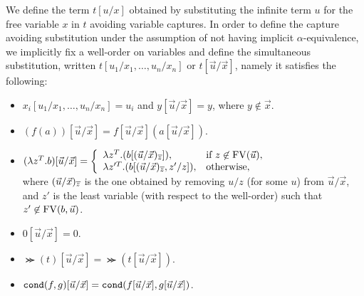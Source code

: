 We define the term $t[u/x]$ obtained by substituting the infinite term $u$ for the free variable $x$ in $t$ 
avoiding variable captures.
In order to define the capture avoiding substitution
under the assumption of not having implicit $\alpha$-equivalence, 
we implicitly fix a well-order on variables
and define the simultaneous substitution,
written $t[u_1/x_1,\ldots,u_n/x_n]$ or $t[\vec{u}/{\vec{x}}]$,
namely it satisfies the following:
\begin{itemize}
\item
  $x_i[u_1/x_1,\ldots,u_n/x_n] = u_i$ and $y[\vec{u}/\vec{x}] = y$, where $y\not\in\vec{x}$. 
\item
  $(f(a))[\vec{u}/\vec{x}] = f[\vec{u}/\vec{x}](a[\vec{u}/\vec{x}])$.
\item
  $(\lambda z^T.b)[\vec{u}/\vec{x}] =
  \left\{
  \begin{array}{ll}
    \lambda z^T.(b[(\vec{u}/\vec{x})_{\overline{z}}]),
    &
    \text{if $z \not\in {{\rm FV}}(\vec{u})$},
    \\
    \lambda z'^T.(b[(\vec{u}/\vec{x})_{\overline{z}},z'/z]),
    &
    \text{otherwise},
  \end{array}
  \right.$
  \\
  where
  $(\vec{u}/\vec{x})_{\overline{z}}$ is the one obtained by removing $u/z$ (for some $u$) from $\vec{u}/\vec{x}$,
  and 
  $z'$ is the least variable (with respect to the well-order)
  such that $z' \not\in {{\rm FV}}(b,\vec{u})$.
\item
  $0[\vec{u}/\vec{x}] = 0$.
\item
  $\Succ(t)[\vec{u}/\vec{x}] = \Succ(t[\vec{u}/\vec{x}])$.
\item
  ${\tt cond}(f,g)[\vec{u}/\vec{x}] = {\tt cond}(f[\vec{u}/\vec{x}],g[\vec{u}/\vec{x}])$.
\end{itemize}

